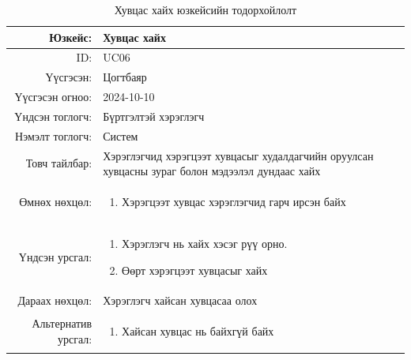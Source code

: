 \begin{longtable}{|r|p{11.5cm}|}
    \caption{Хувцас хайх юзкейсийн тодорхойлолт} 
    \label{table:songolt3}\\ \hline
    {Юзкейс:} & {Хувцас хайх}\\ \hline
    {ID:} & {UC06}\\ \hline
    {Үүсгэсэн:} & {Цогтбаяр}\\ \hline
    {Үүсгэсэн огноо:} & {2024-10-10}\\ \hline
    {Үндсэн тоглогч:} & {Бүртгэлтэй хэрэглэгч}\\ \hline
    {Нэмэлт тоглогч:} & {Систем}\\ \hline
    {Товч тайлбар:} & {Хэрэглэгчид хэрэгцээт хувцасыг худалдагчийн оруулсан хувцасны зураг болон мэдээлэл дундаас хайх}\\ \hline
    {Өмнөх нөхцөл:} & {\begin{enumerate}
        \item Хэрэгцээт хувцас хэрэглэгчид гарч ирсэн байх
    \end{enumerate}}\\ \hline
    {Үндсэн урсгал:} & {\begin{enumerate}
        \item Хэрэглэгч нь хайх хэсэг рүү орно.
    \item Өөрт хэрэгцээт хувцасыг хайх
   \end{enumerate}}\\ \hline
    {Дараах нөхцөл:} & {Хэрэглэгч хайсан хувцасаа олох}\\ \hline
    {Альтернатив урсгал:} & {\begin{enumerate}
        \item Хайсан хувцас нь байхгүй байх
    \end{enumerate}}\\ \hline
\end{longtable}
\newpage
